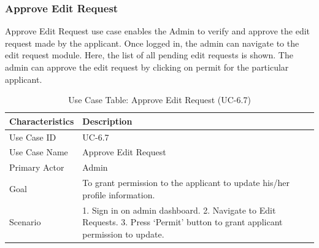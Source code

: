 \subsubsection{Approve Edit Request}
Approve Edit Request use case enables the Admin to verify and approve the edit request made by the applicant. Once logged in, the admin can navigate to the edit request module. Here, the list of all pending edit requests is shown. The admin can approve the edit request by clicking on permit for the particular applicant.
\begin{table}[H]
    \centering
    \small
    \renewcommand{\arraystretch}{1.4}
    \caption{Use Case Table: Approve Edit Request (UC-6.7)}
    \label{tab:approve_edit_request} 
    
    \begin{tabularx}{\textwidth}{|l|X|}
        \hline
        \rowcolor[gray]{0.9} {Characteristics} & {Description} \\ \hline
        Use Case ID & UC-6.7 \\ \hline
        Use Case Name & Approve Edit Request \\ \hline
        Primary Actor & Admin \\ \hline
        Goal & To grant permission to the applicant to update his/her profile information. \\ \hline
        Scenario & 1. Sign in on admin dashboard. 2. Navigate to Edit Requests. 3. Press ‘Permit’ button to grant applicant permission to update. \\ \hline
    \end{tabularx}
\end{table}
\FloatBarrier